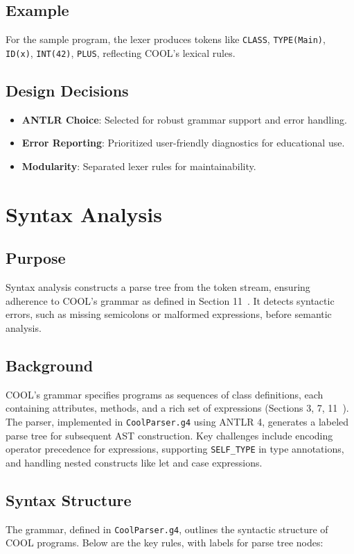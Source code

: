 \documentclass[11pt, titlepage]{article}
\begin{document}
\subsection{Example}
For the sample program, the lexer produces tokens like \texttt{CLASS}, \texttt{TYPE(Main)}, \texttt{ID(x)}, \texttt{INT(42)}, \texttt{PLUS}, reflecting COOL's lexical rules.

\subsection{Design Decisions}
\begin{itemize}[leftmargin=*]
    \item \textbf{ANTLR Choice}: Selected for robust grammar support and error handling.
    \item \textbf{Error Reporting}: Prioritized user-friendly diagnostics for educational use.
    \item \textbf{Modularity}: Separated lexer rules for maintainability.
\end{itemize}

\section{Syntax Analysis}
\label{sec:syntax}

\subsection{Purpose}
Syntax analysis constructs a parse tree from the token stream, ensuring adherence to COOL's grammar as defined in Section 11~\cite{cool_manual}. It detects syntactic errors, such as missing semicolons or malformed expressions, before semantic analysis.

\subsection{Background}
COOL's grammar specifies programs as sequences of class definitions, each containing attributes, methods, and a rich set of expressions (Sections 3, 7, 11~\cite{cool_manual}). The parser, implemented in \texttt{CoolParser.g4} using ANTLR 4, generates a labeled parse tree for subsequent AST construction. Key challenges include encoding operator precedence for expressions, supporting \texttt{SELF\_TYPE} in type annotations, and handling nested constructs like let and case expressions.

\subsection{Syntax Structure}
The grammar, defined in \texttt{CoolParser.g4}, outlines the syntactic structure of COOL programs. Below are the key rules, with labels for parse tree nodes:
\end{document}
